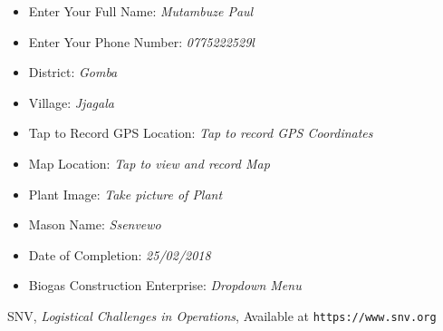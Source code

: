 \documentclass[options]{article}
\begin{document}
\begin{itemize}
\item Enter Your Full Name: \textit{Mutambuze Paul}
\item Enter Your Phone Number: \textit{0775222529l}
\item District: \textit{Gomba}
\item Village: \textit{Jjagala}
\item Tap to Record GPS Location: \textit{Tap to record GPS Coordinates}
\item Map Location: \textit{Tap to view and record Map}
\item Plant Image: \textit{Take picture of Plant}
\item Mason Name: \textit{Ssenvewo}
\item Date of Completion: \textit{25/02/2018}
\item Biogas Construction Enterprise: \textit{Dropdown Menu}
\end{itemize}

\begin{thebibliography}{10}  SNV, \emph{Logistical Challenges in Operations}, Available at \texttt{https://www.snv.org} \end{thebibliography}
\end{document}
